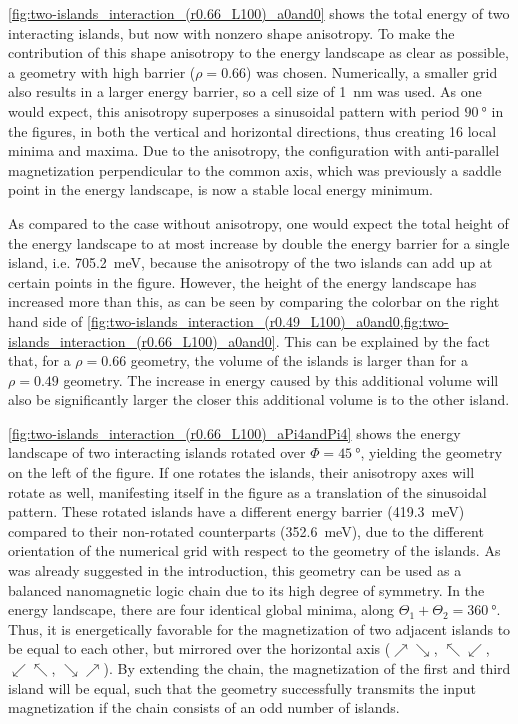 \documentclass[11pt,a4paper,english,twoside]{article}
\begin{document}
\cref{fig:two-islands_interaction_(r0.66_L100)_a0and0} shows the total energy of two interacting islands, but now with nonzero shape anisotropy. To make the contribution of this shape anisotropy to the energy landscape as clear as possible, a geometry with high barrier ($\rho=0.66$) was chosen. Numerically, a smaller grid also results in a larger energy barrier, so a cell size of \SI{1}{\nano\metre} was used. As one would expect, this anisotropy superposes a sinusoidal pattern with period $\SI{90}{\degree}$ in the figures, in both the vertical and horizontal directions, thus creating 16 local minima and maxima. Due to the anisotropy, the configuration with anti-parallel magnetization perpendicular to the common axis, which was previously a saddle point in the energy landscape, is now a stable local energy minimum. \par
As compared to the case without anisotropy, one would expect the total height of the energy landscape to at most increase by double the energy barrier for a single island, i.e. \SI{705.2}{\milli\electronvolt}, because the anisotropy of the two islands can add up at certain points in the figure. However, the height of the energy landscape has increased more than this, as can be seen by comparing the colorbar on the right hand side of \cref{fig:two-islands_interaction_(r0.49_L100)_a0and0,fig:two-islands_interaction_(r0.66_L100)_a0and0}. This can be explained by the fact that, for a $\rho=0.66$ geometry, the volume of the islands is larger than for a $\rho=0.49$ geometry. The increase in energy caused by this additional volume will also be significantly larger the closer this additional volume is to the other island. \par
\cref{fig:two-islands_interaction_(r0.66_L100)_aPi4andPi4} shows the energy landscape of two interacting islands rotated over $\Phi=\SI{45}{\degree}$, yielding the geometry on the left of the figure. If one rotates the islands, their anisotropy axes will rotate as well, manifesting itself in the figure as a translation of the sinusoidal pattern. These rotated islands have a different energy barrier (\SI{419.3}{\milli\electronvolt}) compared to their non-rotated counterparts (\SI{352.6}{\milli\electronvolt}), due to the different orientation of the numerical grid with respect to the geometry of the islands. As was already suggested in the introduction, this geometry can be used as a balanced nanomagnetic logic chain due to its high degree of symmetry. In the energy landscape, there are four identical global minima, along $\Theta_1 + \Theta_2 = \SI{360}{\degree}$. Thus, it is energetically favorable for the magnetization of two adjacent islands to be equal to each other, but mirrored over the horizontal axis ($\nearrow \searrow$, $\nwarrow \swarrow$, $\swarrow \nwarrow$, $\searrow \nearrow$). By extending the chain, the magnetization of the first and third island will be equal, such that the geometry successfully transmits the input magnetization if the chain consists of an odd number of islands. 
\end{document}
